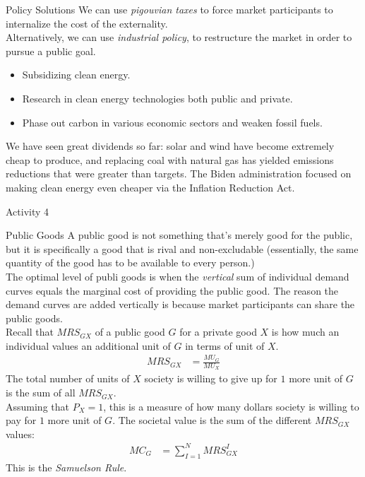 \documentclass[8pt]{extarticle}
\begin{document}
  \begin{problem}{Policy Solutions}
    We can use \textit{pigouvian taxes} to force market participants to internalize the cost of the externality.\\

    Alternatively, we can use \textit{industrial policy}, to restructure the market in order to pursue a public goal.
    \begin{itemize}
      \item Subsidizing clean energy.
      \item Research in clean energy technologies both public and private.
      \item Phase out carbon in various economic sectors and weaken fossil fuels.
    \end{itemize}
    We have seen great dividends so far: solar and wind have become extremely cheap to produce, and replacing coal with natural gas has yielded emissions reductions that were greater than targets. The Biden administration focused on making clean energy even cheaper via the Inflation Reduction Act.
  \end{problem}
  \begin{problem}{Activity 4}
    \begin{tcbraster}[raster columns = 1,colframe = black!75!white,colback=white]
    \end{tcbraster}
  \end{problem}
  \begin{problem}{Public Goods}
    A public good is not something that's merely good for the public, but it is specifically a good that is rival and non-excludable (essentially, the same quantity of the good has to be available to every person.)\\

    The optimal level of publi goods is when the \textit{vertical} sum of individual demand curves equals the marginal cost of providing the public good. The reason the demand curves are added vertically is because market participants can share the public goods.\\

    Recall that $MRS_{GX}$ of a public good $G$ for a private good $X$ is how much an individual values an additional unit of $G$ in terms of unit of $X$.
    \begin{align*}
      MRS_{GX} &= \frac{MU_G}{MU_X}
    \end{align*}
    The total number of units of $X$ society is willing to give up for $1$ more unit of $G$ is the sum of all $MRS_{GX}$.\\

    Assuming that $P_X = 1$, this is a measure of how many dollars society is willing to pay for $1$ more unit of $G$. The societal value is the sum of the different $MRS_{GX}$ values:
    \begin{align*}
      MC_G &= \sum_{I=1}^{N} MRS_{GX}^I
    \end{align*}
    This is the \textit{Samuelson Rule}.
  \end{problem}
\end{document}
